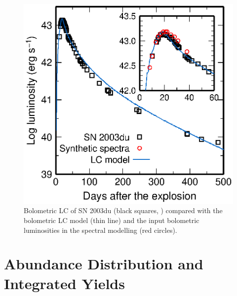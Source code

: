 \documentclass[usegraphicx,usenatbib]{mn2e}
\begin{document}
\begin{figure}
  \includegraphics[scale=0.7]{f6.eps} 
  \caption{Bolometric LC of SN 2003du (black squares, \citealt{stanishev07}) 
compared with the bolometric LC model (thin line) and 
the input bolometric luminosities in the spectral modelling (red circles).
  }
\label{fig:LC}
\end{figure}

\section{Abundance Distribution and Integrated Yields}
\label{sec:abun}
\end{document}
